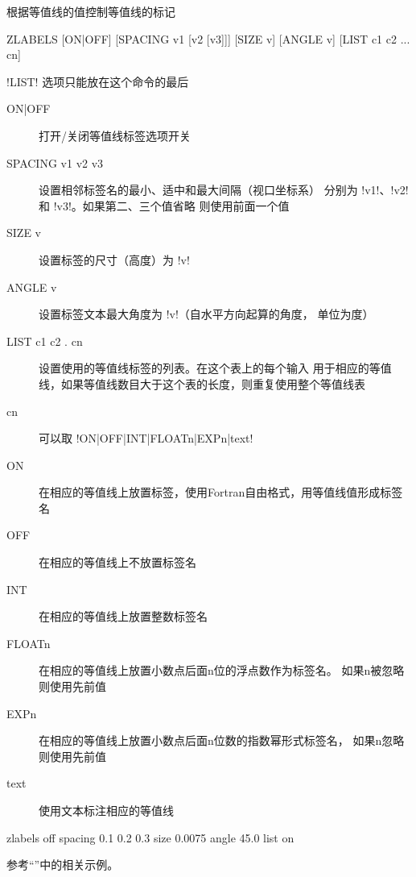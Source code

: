 \label{cmd:zlabels}

根据等值线的值控制等值线的标记

\begin{SACSTX}
ZLABELS [ON|OFF] [SPACING v1 [v2 [v3]]] [SIZE v] [ANGLE v] [LIST c1 c2 ... cn]
\end{SACSTX}
!LIST! 选项只能放在这个命令的最后

\begin{description}
\item [ON|OFF] 打开/关闭等值线标签选项开关
\item [SPACING v1 v2 v3] 设置相邻标签名的最小、适中和最大间隔（视口坐标系）
    分别为 !v1!、!v2! 和 !v3!。如果第二、三个值省略
    则使用前面一个值
\item [SIZE v] 设置标签的尺寸（高度）为 !v!
\item [ANGLE v] 设置标签文本最大角度为 !v!（自水平方向起算的角度，
    单位为度）
\item [LIST c1 c2 . cn] 设置使用的等值线标签的列表。在这个表上的每个输入
    用于相应的等值线，如果等值线数目大于这个表的长度，则重复使用整个等值线表
\item [cn]  可以取 !ON|OFF|INT|FLOATn|EXPn|text!
\item [ON] 在相应的等值线上放置标签，使用Fortran自由格式，用等值线值形成标签名
\item [OFF] 在相应的等值线上不放置标签名
\item [INT] 在相应的等值线上放置整数标签名
\item [FLOATn] 在相应的等值线上放置小数点后面n位的浮点数作为标签名。
    如果n被忽略则使用先前值
\item [EXPn] 在相应的等值线上放置小数点后面n位数的指数幂形式标签名，
    如果n忽略则使用先前值
\item [text] 使用文本标注相应的等值线
\end{description}

\begin{SACDFT}
zlabels off spacing 0.1 0.2 0.3 size 0.0075 angle 45.0 list on
\end{SACDFT}

参考``''中的相关示例。
